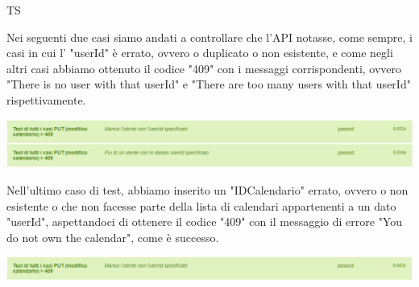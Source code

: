 \begin{listaPersonale}{TS}
\begin{center}
                \end{center}
                Nei seguenti due casi siamo andati a controllare che l'API notasse, come sempre, i casi in cui l' "userId" è errato, ovvero o duplicato o non esistente, e come negli altri casi abbiamo ottenuto il codice "409" con i messaggi corrispondenti, ovvero "There is no user with that userId" e "There are too many users with that userId" rispettivamente.
                \begin{center}
                        \includegraphics[width=1\textwidth, height=0.08\textheight]{img/png/tests/CalendarioPut/409_userId_PutCalendario.png}
                \end{center}
                Nell'ultimo caso di test, abbiamo inserito un "IDCalendario" errato, ovvero o non esistente o che non facesse parte della lista di calendari appartenenti a un dato "userId", aspettandoci di ottenere il codice "409" con il messaggio di errore "You do not own the calendar", come è successo.
                \begin{center}
                        \includegraphics[width=1\textwidth, height=0.04\textheight]{img/png/tests/CalendarioPut/409_PutCalendario.png}
                \end{center}

\end{listaPersonale}
